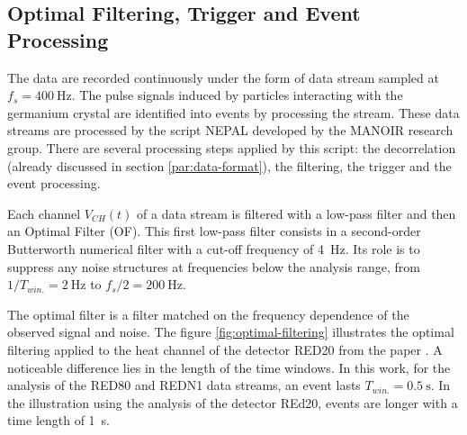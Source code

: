 \subsection{Optimal Filtering, Trigger and Event Processing}
\label{par:optimal-filtering}
\label{par:trigger}


The data are recorded continuously under the form of data stream sampled at $f_s=\SI{400}{\Hz}$. The pulse signals induced by particles interacting with the germanium crystal are identified into events by processing the stream. These data streams are processed by the script NEPAL developed by the MANOIR research group. There are several processing steps applied by this script: the decorrelation (already discussed in section \ref{par:data-format}), the filtering, the trigger and the event processing. 

Each channel $V_{CH}(t)$ of a data stream is filtered with a low-pass filter and then an Optimal Filter (OF). This first low-pass filter consists in a second-order Butterworth numerical filter with a cut-off frequency of \SI{4}{\Hz}. Its role is to suppress any noise structures at frequencies below the analysis range, from $1/T_{win.}=\SI{2}{\Hz}$ to $f_s/2=\SI{200}{\Hz}$. 

The optimal filter is a filter matched on the frequency dependence of the observed signal and noise. The figure \ref{fig:optimal-filtering} illustrates the optimal filtering applied to the heat channel of the detector RED20 from the paper \cite{Armengaud:2019kfj}. A noticeable difference lies in the length of the time windows. In this work, for the analysis of the RED80 and REDN1 data streams, an event lasts $T_{win.} = \SI{0.5}{\s}$. In the illustration using the analysis of the detector REd20, events are longer with a time length of \SI{1}{\s}.

